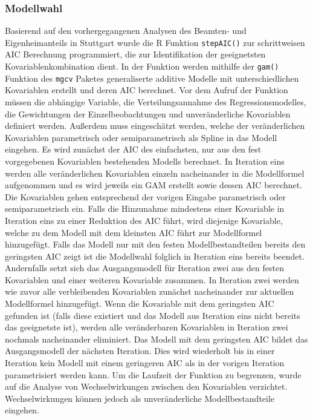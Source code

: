 \documentclass{Vorlage}
\begin{document}
\subsubsection{Modellwahl}
Basierend auf den vorhergegangenen Analysen des Beamten- und Eigenheimanteils in Stuttgart wurde die R Funktion \texttt{stepAIC()} zur schrittweisen AIC \cite{Akaike1981} Berechnung programmiert, die zur Identifikation der geeignetsten Kovariablenkombination dient. In der Funktion werden mithilfe der \texttt{gam()} Funktion des \texttt{mgcv} Paketes \cite{Wood2011} generaliserte additive Modelle mit unterschiedlichen Kovariablen erstellt und deren AIC berechnet. Vor dem Aufruf der Funktion müssen die abhängige Variable, die Verteilungsannahme des Regressionsmodelles, die Gewichtungen der Einzelbeobachtungen und unveränderliche Kovariablen definiert werden. Außerdem muss eingeschätzt werden, welche der veränderlichen Kovariablen parametrisch oder semiparametrisch als Spline in das Modell eingehen. Es wird zunächst der AIC des einfachsten, nur aus den fest vorgegebenen Kovariablen bestehenden Modells berechnet. In Iteration eins werden alle veränderlichen Kovariablen einzeln nacheinander in die Modellformel aufgenommen und es wird jeweils ein GAM erstellt sowie dessen AIC berechnet. Die Kovariablen gehen entsprechend der vorigen Eingabe parametrisch oder semiparametrisch ein. Falls die Hinzunahme mindestens einer Kovariable in Iteration eins zu einer Reduktion des AIC führt, wird diejenige Kovariable, welche zu dem Modell mit dem kleinsten AIC führt zur Modellformel hinzugefügt. Falls das Modell nur mit den festen Modellbestandteilen bereits den geringsten AIC zeigt ist die Modellwahl folglich in Iteration eins bereits beendet.\\ Andernfalls setzt sich das Ausgangsmodell für Iteration zwei aus den festen Kovariablen und einer weiteren Kovariable zusammen. In Iteration zwei werden wie zuvor alle verbleibenden Kovariablen zunächst nacheinander zur aktuellen Modellformel hinzugefügt. Wenn die Kovariable mit dem geringsten AIC gefunden ist (falls diese existiert und das Modell aus Iteration eins nicht bereits das geeignetste ist), werden alle veränderbaren Kovariablen in Iteration zwei nochmals nacheinander eliminiert. Das Modell mit dem geringsten AIC bildet das Ausgangsmodell der nächsten Iteration. Dies wird wiederholt bis in einer Iteration kein Modell mit einem geringeren AIC als in der vorigen Iteration parametrisiert werden kann. Um die Laufzeit der Funktion zu begrenzen, wurde auf die Analyse von Wechselwirkungen zwischen den Kovariablen verzichtet. Wechselwirkungen können jedoch als unveränderliche Modellbestandteile eingehen.
\end{document}
